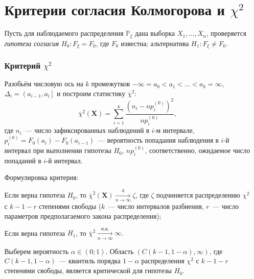 \section{Критерии согласия Колмогорова и $\chi^{2}$}

Пусть для наблюдаемого распределения $\mathbb{P}_{\xi}$ дана выборка $X_1, \ldots, X_n$, проверяется {\it гипотеза согласия} $H_{0}: F_{\xi}=F_{0}$, где $F_{0}$ известна; альтернатива $H_{1}: F_{\xi} \neq F_{0}$.

\subsubsection{Критерий $\chi^{2}$}
Разобьём числовую ось на $k$ промежутков ${-\infty=a_{0}<a_{1}<\ldots<a_{k}=\infty}$, ${\Delta_{i}=\left(a_{i-1}, a_{i}\right]}$ и построим статистику $\overline{\chi}^{2}$:
\begin{equation*}
    \overline{\chi}^{2}(\mathbf{X})=\sum\limits_{i=1}^{k} \frac{\left(n_{i}-n p_{i}^{(0)}\right)^{2}}{n p_{i}^{(0)}},
\end{equation*}
где $n_i$~--- число зафиксированных наблюдений в $i$-м интервале,
$p_{i}^{(0)}=F_{0}\left(a_{i}\right)-F_{0}\left(a_{i-1}\right)$~--- вероятность попадания наблюдения в $i$-й интервал при выполнении гипотезы $H_0$, $n p_{i}^{(0)}$, соответственно, ожидаемое число попаданий в $i$-й интервал.

Формулировка критерия:
\begin{compactlist}
    \item Если верна гипотеза $H_0$, то $\overline{\chi}^{2}\left(\mathbf{X}\right) \xrightarrow[n \to \infty]{\text{d}} \zeta$, где $\zeta$ подчиняется распределению $\chi^{2}$ с $k-1-r$ степенями свободы ($k$~--- число интервалов разбиения, $r$~--- число параметров предполагаемого закона распределения);
    \item Если верна гипотеза $H_1$, то $\overline{\chi}^{2} \xrightarrow[n \to \infty]{\text{п.н.}} \infty$.
\end{compactlist}

Выберем вероятность $\alpha \in (0;1)$. Область $(C(k-1,1-\alpha), \infty)$, где $C(k-1,1-\alpha)$~--- квантиль порядка $1-\alpha$ распределения $\chi^{2}$ с $k-1-r$ степенями свободы, является критической для гипотезы $H_0$.

